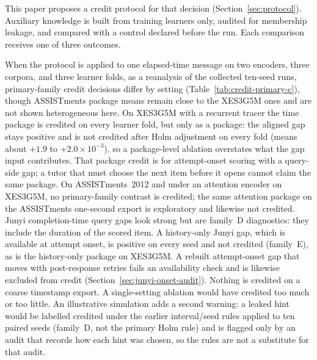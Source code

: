 \documentclass[review,12pt]{elsarticle}
\begin{document}
This paper proposes a credit protocol for that decision
(Section~\ref{sec:protocol}). Auxiliary knowledge is built from training
learners only, audited for membership leakage, and compared with a
control declared before the run. Each comparison receives one of three
outcomes.

When the protocol is applied to one elapsed-time message on two
encoders, three corpora, and three learner folds, as a reanalysis of
the collected ten-seed runs, primary-family credit
decisions differ by setting (Table~\ref{tab:credit-primary-c}), though
ASSISTments package means remain close to the XES3G5M ones and are not
shown heterogeneous here. On XES3G5M with a recurrent tracer the time
package is credited on every learner fold, but only as a package: the
aligned gap stays positive and is not credited after Holm adjustment on
every fold (means about $+1.9$ to $+2.0\times 10^{-3}$), so a
package-level ablation overstates what the gap input contributes. That
package credit is for attempt-onset scoring with a query-side gap; a
tutor that must choose the next item before it opens cannot claim the
same package. On ASSISTments~2012 and under an attention encoder on
XES3G5M, no primary-family contrast is credited; the same attention
package on the ASSISTments one-second export is exploratory and
likewise not credited. Junyi completion-time query gaps look strong but
are family~D diagnostics: they include the duration of the scored item.
A history-only Junyi gap, which is available at attempt onset, is
positive on every seed and not credited (family~E), as is the
history-only package on XES3G5M. A rebuilt attempt-onset gap that moves
with post-response retries fails an availability check and is likewise
excluded from credit (Section~\ref{sec:junyi-onset-audit}). Nothing is
credited on a coarse timestamp export. A single-setting ablation would have credited too
much or too little. An illustrative simulation adds a second warning: a
leaked hint would be labelled credited under the earlier
interval/seed rules applied to ten paired seeds (family~D, not the
primary Holm rule) and is flagged only by an audit that records how
each hint was chosen, so the rules are not a substitute for that audit.
\end{document}
